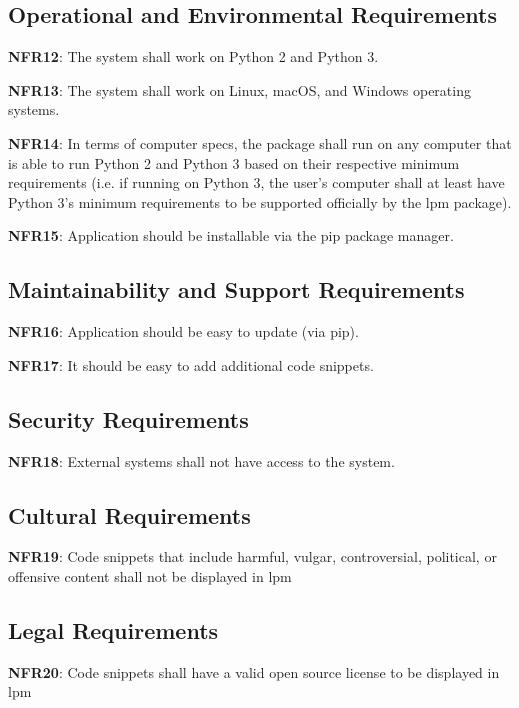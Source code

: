\documentclass[12pt, titlepage]{article}
\begin{document}
\subsection{Operational and Environmental Requirements}

\noindent \textbf{NFR12}: The system shall work on Python 2 and Python 3.

\noindent \textbf{NFR13}: The system shall work on Linux, macOS, and Windows operating systems.

\noindent \textbf{NFR14}: In terms of computer specs, the package shall run on any computer that is able to run Python 2 and Python 3 based on their respective minimum requirements (i.e. if running on Python 3, the user's computer shall at least have Python 3's minimum requirements to be supported officially by the lpm package).

\noindent \textbf{NFR15}: Application should be installable via the pip package manager.

\subsection{Maintainability and Support Requirements}

\noindent \textbf{NFR16}: Application should be easy to update (via pip).

\noindent \textbf{NFR17}: It should be easy to add additional code snippets.

\subsection{Security Requirements}

\noindent \textbf{NFR18}: External systems shall not have access to the system.

\subsection{Cultural Requirements}

\noindent \textbf{NFR19}: Code snippets that include harmful, vulgar, controversial, political, or offensive content shall not be displayed in lpm

\subsection{Legal Requirements}

\noindent \textbf{NFR20}: Code snippets shall have a valid open source license to be displayed in lpm
\end{document}
